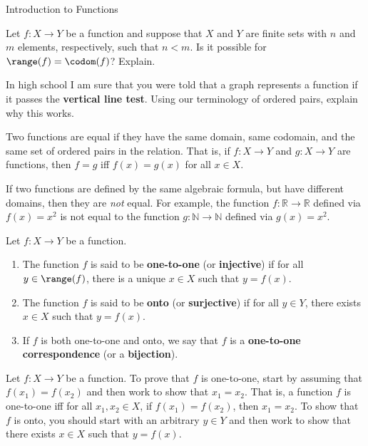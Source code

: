 \begin{section}{Introduction to Functions}
\begin{problem}
Let $f:X\to Y$ be a function and suppose that $X$ and $Y$ are finite sets with $n$ and $m$ elements, respectively, such that $n<m$.  Is it possible for $\range(f)=\codom(f)$?  Explain.
\end{problem}

\begin{problem}
In high school I am sure that you were told that a graph represents a function if it passes the \textbf{vertical line test}.  Using our terminology of ordered pairs, explain why this works.
\end{problem}

\begin{definition}
Two functions are equal if they have the same domain, same codomain, and the same set of ordered pairs in the relation. That is, if $f:X\to Y$ and $g:X\to Y$ are functions, then $f=g$ iff $f(x)=g(x)$ for all $x\in X$.
\end{definition}

If two functions are defined by the same algebraic formula, but have different domains, then they are \emph{not} equal.  For example, the function $f:\mathbb{R}\to \mathbb{R}$ defined via $f(x)=x^{2}$ is not equal to the function $g:\mathbb{N}\to\mathbb{N}$ defined via $g(x)=x^{2}$.

\begin{definition}
Let $f:X\to Y$ be a function.
\begin{enumerate}[label=\textrm{(\alph*)}]
\item The function $f$ is said to be \textbf{one-to-one} (or \textbf{injective}) if for all $y\in \range(f)$, there is a unique $x\in X$ such that $y=f(x)$.
\item The function $f$ is said to be \textbf{onto} (or \textbf{surjective}) if for all $y\in Y$, there exists $x\in X$ such that $y=f(x)$.
\item If $f$ is both one-to-one and onto, we say that $f$ is a \textbf{one-to-one correspondence} (or a \textbf{bijection}).
\end{enumerate}
\end{definition}

\begin{remark}
Let $f:X\to Y$ be a function. To prove that $f$ is one-to-one, start by assuming that $f(x_{1})=f(x_{2})$ and then work to show that $x_{1}=x_{2}$.  That is, a function $f$ is one-to-one iff for all $x_{1}, x_{2}\in X$, if $f(x_{1})=f(x_{2})$, then $x_{1}=x_{2}$. To show that $f$ is onto, you should start with an arbitrary $y\in Y$ and then work to show that there exists $x\in X$ such that $y=f(x)$.
\end{remark}


\end{section}
